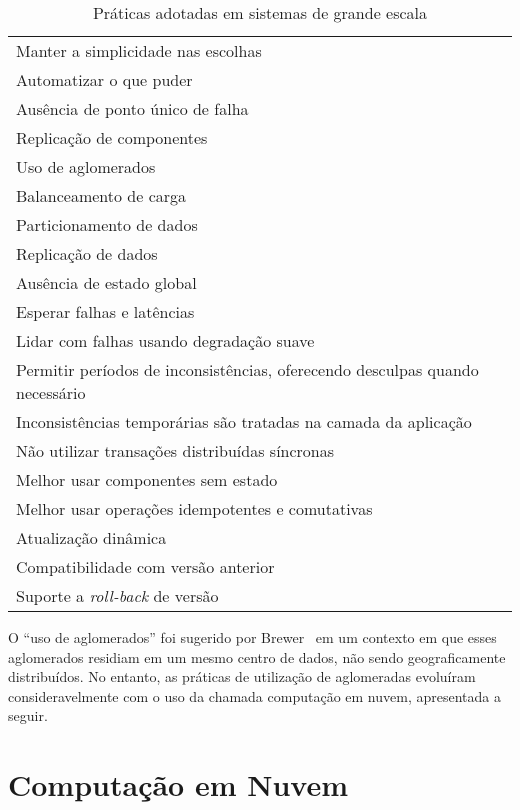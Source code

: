 \begin{table}[!t]
\begin{center}
    \begin{tabular}{l}
	 \hline
Manter a simplicidade nas escolhas \\
Automatizar o que puder \\
Ausência de ponto único de falha \\
Replicação de componentes \\
Uso de aglomerados \\
Balanceamento de carga \\
Particionamento de dados \\
Replicação de dados \\
Ausência de estado global  \\%
Esperar falhas e latências  \\
Lidar com falhas usando degradação suave \\
Permitir períodos de inconsistências, oferecendo desculpas quando necessário \\
Inconsistências temporárias são tratadas na camada da aplicação \\
Não utilizar transações distribuídas síncronas \\
Melhor usar componentes sem estado  \\%
Melhor usar operações idempotentes e comutativas \\
Atualização dinâmica \\
Compatibilidade com versão anterior \\
Suporte a \emph{roll-back} de versão \\
	 \hline
    \end{tabular}
  \caption{Práticas adotadas em sistemas de grande escala}
  \label{tab:escala}
\end{center}
\end{table}

O ``uso de aglomerados'' foi sugerido por Brewer~\cite{Brewer2001GiantScale} em um contexto em que esses aglomerados residiam em um mesmo centro de dados, não sendo geograficamente distribuídos. No entanto, as práticas de utilização de aglomeradas evoluíram consideravelmente com o uso da chamada computação em nuvem, apresentada a seguir.

\section{Computação em Nuvem}

